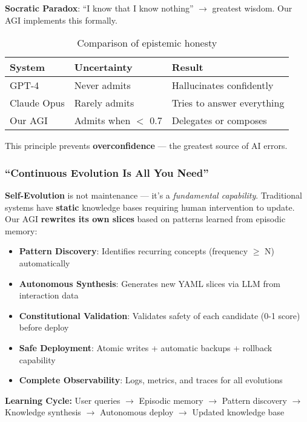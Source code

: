 \documentclass[11pt]{article}
\begin{document}
\textbf{Socratic Paradox}: ``I know that I know nothing'' $\rightarrow$ greatest wisdom. Our AGI implements this formally.

\begin{table}[H]
\centering
\begin{tabular}{@{}lll@{}}
\toprule
\textbf{System} & \textbf{Uncertainty} & \textbf{Result} \\ \midrule
GPT-4 & Never admits & Hallucinates confidently \\
Claude Opus & Rarely admits & Tries to answer everything \\
Our AGI & Admits when $<$ 0.7 & Delegates or composes \\ \bottomrule
\end{tabular}
\caption{Comparison of epistemic honesty}
\end{table}

This principle prevents \textbf{overconfidence} --- the greatest source of AI errors.

\subsubsection{``Continuous Evolution Is All You Need''}

\textbf{Self-Evolution} is not maintenance --- it's a \textit{fundamental capability}. Traditional systems have \textbf{static} knowledge bases requiring human intervention to update. Our AGI \textbf{rewrites its own slices} based on patterns learned from episodic memory:

\begin{itemize}
    \item \textbf{Pattern Discovery}: Identifies recurring concepts (frequency $\geq$ N) automatically
    \item \textbf{Autonomous Synthesis}: Generates new YAML slices via LLM from interaction data
    \item \textbf{Constitutional Validation}: Validates safety of each candidate (0-1 score) before deploy
    \item \textbf{Safe Deployment}: Atomic writes + automatic backups + rollback capability
    \item \textbf{Complete Observability}: Logs, metrics, and traces for all evolutions
\end{itemize}

\textbf{Learning Cycle:} User queries $\rightarrow$ Episodic memory $\rightarrow$ Pattern discovery $\rightarrow$ Knowledge synthesis $\rightarrow$ Autonomous deploy $\rightarrow$ Updated knowledge base
\end{document}
